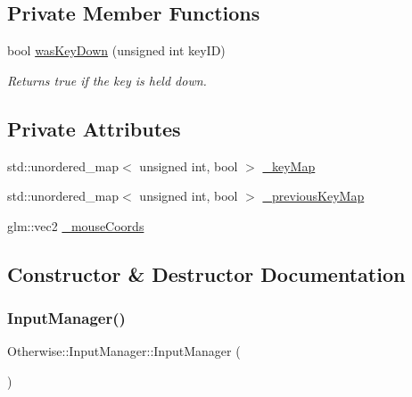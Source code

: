 \subsection*{Private Member Functions}
\begin{DoxyCompactItemize}
\item 
bool \hyperlink{class_otherwise_1_1_input_manager_aa869a9a4f0f504d61dc091ef5060648e}{was\+Key\+Down} (unsigned int key\+ID)
\begin{DoxyCompactList}\small\item\em Returns true if the key is held down. \end{DoxyCompactList}\end{DoxyCompactItemize}
\subsection*{Private Attributes}
\begin{DoxyCompactItemize}
\item 
std\+::unordered\+\_\+map$<$ unsigned int, bool $>$ \hyperlink{class_otherwise_1_1_input_manager_af35f347886956581c8162fd398e774b9}{\+\_\+key\+Map}
\item 
std\+::unordered\+\_\+map$<$ unsigned int, bool $>$ \hyperlink{class_otherwise_1_1_input_manager_a2a7308f34f0c13ab0cc1eae3c983333f}{\+\_\+previous\+Key\+Map}
\item 
glm\+::vec2 \hyperlink{class_otherwise_1_1_input_manager_aa782055c173d482fb30cd466a56e0b95}{\+\_\+mouse\+Coords}
\end{DoxyCompactItemize}


\subsection{Constructor \& Destructor Documentation}
\mbox{\label{class_otherwise_1_1_input_manager_aa1f22cbef02930281a9e78b0890d31dc}} 
\subsubsection{\texorpdfstring{Input\+Manager()}{InputManager()}}
{\footnotesize\ttfamily Otherwise\+::\+Input\+Manager\+::\+Input\+Manager (\begin{DoxyParamCaption}{ }\end{DoxyParamCaption})}

